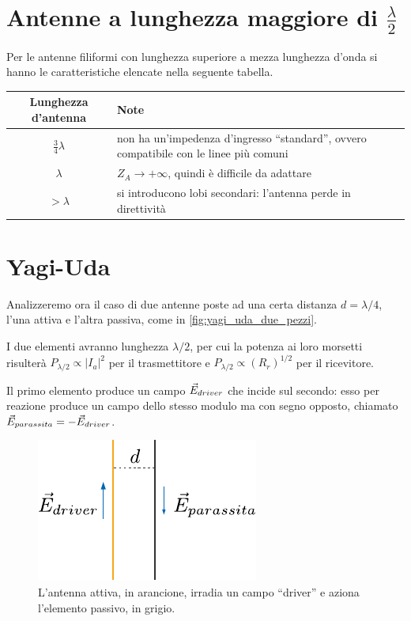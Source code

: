 \section{Antenne a lunghezza maggiore di $\frac{\lambda}{2}$}
Per le antenne filiformi con lunghezza superiore a mezza lunghezza d'onda si hanno le caratteristiche elencate nella seguente tabella.

\begin{table}[hb!]
	\centering
	\begin{tabular}{cC{8cm}}
		\toprule
		Lunghezza d'antenna & Note\\
		\midrule
		 \vspace{2mm}
		$\frac{3}{4}\lambda$ & non ha un'impedenza d'ingresso  ``standard'', ovvero compatibile con le linee più comuni \\ \vspace{2mm}
		$\lambda$ & $Z_A \to +\infty$, quindi è difficile da adattare \\
		$>\lambda$ & si introducono lobi secondari: l'antenna perde in direttività \\
		\bottomrule
	\end{tabular}
\end{table}

\section{Yagi-Uda}
Analizzeremo ora il caso di due antenne poste ad una certa distanza $d = \lambda / 4$, l'una attiva e l'altra passiva, come in \autoref{fig:yagi_uda_due_pezzi}.

I due elementi avranno lunghezza $\lambda/2$, per cui la potenza ai loro morsetti risulterà $P_{\lambda/2}\propto \left | I_a \right |^2$ per il trasmettitore e $P_{\lambda/2}\propto (R_r)^{1/2}$ per il ricevitore.

Il primo elemento produce un campo $\vec{E}_{driver}$ che incide sul secondo: esso per reazione produce un campo dello stesso modulo ma con segno opposto, chiamato $\vec{E}_{parassita} = -\vec{E}_{driver}$.

\begin{figure}[htp]
	\centering
	\includegraphics[]{img/yagi_uda_due_pezzi.pdf}
	\caption{L'antenna attiva, in arancione, irradia un campo ``driver'' e aziona l'elemento passivo, in grigio.}
	\label{fig:yagi_uda_due_pezzi}
\end{figure}

